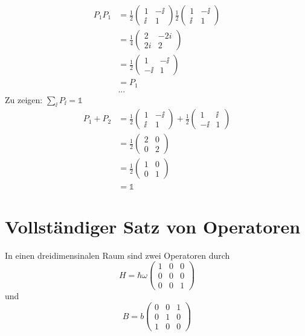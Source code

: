 \begin{align*}
    P_1P_1 &= 
    \frac 12 \begin{pmatrix} 1 &-\ii \\ \ii & 1 \end{pmatrix} 
        \frac 12 \begin{pmatrix} 1 & -\ii \\ \ii & 1 \end{pmatrix} \\
                                   &= \frac 14 \begin{pmatrix} 2 & -2i \\ 2i & 2 \end{pmatrix} \\
                                   &=\frac 12 \begin{pmatrix} 1 &-\ii \\ -\ii & 1 \end{pmatrix} \\
                                   &=P_1 \\
    &...
\end{align*}
Zu zeigen: $\sum_\ii P_\ii = \mathbb{1}$
\begin{align*}
    P_1+P_2 &= \frac 12 \begin{pmatrix} 1 &-\ii \\ \ii & 1 \end{pmatrix} +
        \frac 12 \begin{pmatrix} 1 & \ii \\ -\ii & 1 \end{pmatrix} \\
                                   &= \frac 12 \begin{pmatrix} 2 & 0 \\ 0 & 2 \end{pmatrix} \\
                                   &=\frac 12 \begin{pmatrix} 1 & 0 \\ 0 & 1 \end{pmatrix} \\
                                   &= \mathbb{1}
\end{align*}

\section{Vollständiger Satz von Operatoren}

In einen dreidimensinalen Raum sind zwei Operatoren durch
\[
    H = \hbar\omega 
    \begin{pmatrix}
        1 & 0 & 0 \\
        0 & 0 & 0 \\
        0 & 0 & 1
    \end{pmatrix}
\]
und
\[
    B = b
    \begin{pmatrix}
        0 & 0 & 1 \\
        0 & 1 & 0 \\
        1 & 0 & 0 
    \end{pmatrix}
\]

